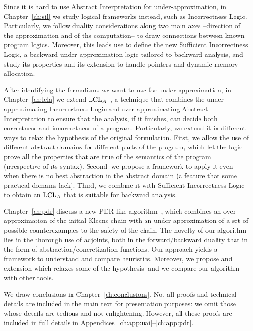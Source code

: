 Since it is hard to use Abstract Interpretation for under\hyp{}approximation, in Chapter~\ref{ch:sil} we study logical frameworks instead, such as Incorrectness Logic. Particularly, we follow duality considerations along two main axes --direction of the approximation and of the computation-- to draw connections between known program logics. Moreover, this leads use to define the new Sufficient Incorrectness Logic, a backward under-approximation logic tailored to backward analysis, and study its properties and its extension to handle pointers and dynamic memory allocation.

After identifying the formalisms we want to use for under-approximation, in Chapter~\ref{ch:lcla} we extend $\text{LCL}_A$~\cite{BGGR23}, a technique that combines the under-approximating Incorrectness Logic and over-approximating Abstract Interpretation to ensure that the analysis, if it finishes, can decide both correctness and incorrectness of a program. Particularly, we extend it in different ways to relax the hypothesis of the original formulation. First, we allow the use of different abstract domains for different parts of the program, which let the logic prove all the properties that are true of the semantics of the program (irrespective of its syntax). Second, we propose a framework to apply it even when there is no best abstraction in the abstract domain (a feature that some practical domains lack). Third, we combine it with Sufficient Incorrectness Logic to obtain an $\text{LCL}_A$ that is suitable for backward analysis.

Chapter~\ref{ch:pdr} discuss a new PDR-like algorithm~\cite{Bradley11}, which combines an over\hyp{}approximation of the initial Kleene chain with an under-approximation of a set of possible counterexamples to the safety of the chain. The novelty of our algorithm lies in the thorough use of adjoints, both in the forward/backward duality that in the form of abstraction/concretization functions. Our approach yields a framework to understand and compare heuristics. Moreover, we propose and extension which relaxes some of the hypothesis, and we compare our algorithm with other tools.

We draw conclusions in Chapter~\ref{ch:conclusions}. Not all proofs and technical details are included in the main text for presentation purposes: we omit those whose details are tedious and not enlightening. However, all these proofs are included in full details in Appendices~\ref{ch:app:uai}--\ref{ch:app:pdr}.
